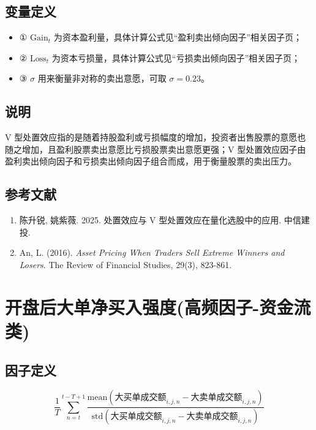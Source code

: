 \documentclass{article}
\begin{document}
\subsection{变量定义}
\begin{itemize}
    \item ① \( \mathrm{Gain}_t \) 为资本盈利量，具体计算公式见“盈利卖出倾向因子”相关因子页；
    \item ② \( \mathrm{Loss}_t \) 为资本亏损量，具体计算公式见“亏损卖出倾向因子”相关因子页；
    \item ③ \( \sigma \) 用来衡量非对称的卖出意愿，可取 \( \sigma = 0.23 \)。
\end{itemize}

\subsection{说明}
V 型处置效应指的是随着持股盈利或亏损幅度的增加，投资者出售股票的意愿也随之增加，且盈利股票卖出意愿比亏损股票卖出意愿更强；V 型处置效应因子由盈利卖出倾向因子和亏损卖出倾向因子组合而成，用于衡量股票的卖出压力。

\subsection{参考文献}
\begin{enumerate}
    \item 陈升锐, 姚紫薇. 2025. 处置效应与 V 型处置效应在量化选股中的应用. 中信建投.
    \item An, L. (2016). \textit{Asset Pricing When Traders Sell Extreme Winners and Losers}. The Review of Financial Studies, 29(3), 823-861.
\end{enumerate}

\section{开盘后大单净买入强度(高频因子-资金流类)}

\subsection{因子定义}

\begin{equation}
    \frac{1}{T} \sum_{n=t}^{t-T+1} \frac{\mathrm{mean}(\text{大买单成交额}_{i,j,n} - \text{大卖单成交额}_{i,j,n})}{\mathrm{std}(\text{大买单成交额}_{i,j,n} - \text{大卖单成交额}_{i,j,n})}
\end{equation}
\end{document}
